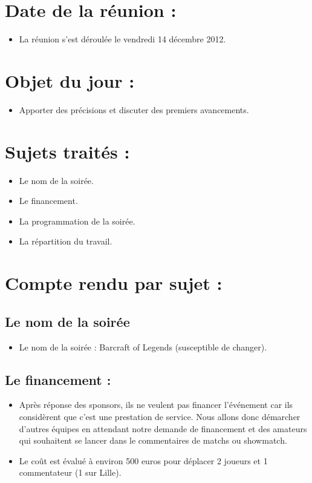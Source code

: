 \section{Date de la réunion :}
\begin{itemize}
\item La réunion s'est déroulée le vendredi 14 décembre 2012.
\end{itemize}

\section{Objet du jour :}
\begin{itemize}
\item Apporter des précisions et discuter des premiers avancements.
\end{itemize}

\section{Sujets traités :}
\begin{itemize}
\item Le nom de la soirée.
\item Le financement.
\item La programmation de la soirée.
\item La répartition du travail.
\end{itemize}

\section{Compte rendu par sujet :}

\subsection{Le nom de la soirée}
\begin{itemize}
\item Le nom de la soirée : Barcraft of Legends (susceptible de changer).
\end{itemize}

\subsection{Le financement :}
\begin{itemize}
\item Après réponse des sponsors, ils ne veulent pas financer l’événement car ils considèrent que c'est une prestation de service.  Nous allons donc démarcher d'autres équipes en attendant notre demande de financement et des amateurs qui souhaitent se lancer dans le commentaires de matchs ou showmatch.
\item Le coût est évalué à environ 500 euros pour déplacer 2 joueurs et 1 commentateur (1 sur Lille).
\end{itemize}

